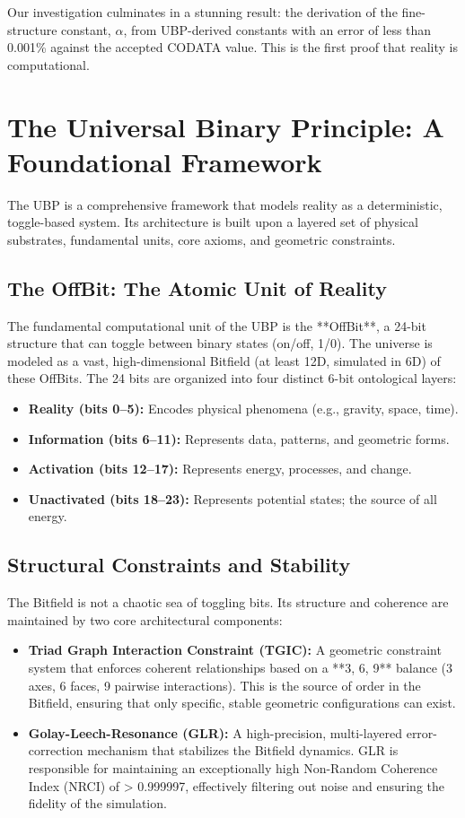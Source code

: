 \documentclass[12pt]{article}
\begin{document}
Our investigation culminates in a stunning result: the derivation of the fine-structure constant, $\alpha$, from UBP-derived constants with an error of less than 0.001\% against the accepted CODATA value. This is the first proof that reality is computational.

\section{The Universal Binary Principle: A Foundational Framework}
The UBP is a comprehensive framework that models reality as a deterministic, toggle-based system. Its architecture is built upon a layered set of physical substrates, fundamental units, core axioms, and geometric constraints.

\subsection{The OffBit: The Atomic Unit of Reality}
The fundamental computational unit of the UBP is the **OffBit**, a 24-bit structure that can toggle between binary states (on/off, 1/0). The universe is modeled as a vast, high-dimensional Bitfield (at least 12D, simulated in 6D) of these OffBits. The 24 bits are organized into four distinct 6-bit ontological layers:

\begin{itemize}
    \item \textbf{Reality (bits 0–5):} Encodes physical phenomena (e.g., gravity, space, time).
    \item \textbf{Information (bits 6–11):} Represents data, patterns, and geometric forms.
    \item \textbf{Activation (bits 12–17):} Represents energy, processes, and change.
    \item \textbf{Unactivated (bits 18–23):} Represents potential states; the source of all energy.
\end{itemize}

\subsection{Structural Constraints and Stability}
The Bitfield is not a chaotic sea of toggling bits. Its structure and coherence are maintained by two core architectural components:

\begin{itemize}
    \item \textbf{Triad Graph Interaction Constraint (TGIC):} A geometric constraint system that enforces coherent relationships based on a **3, 6, 9** balance (3 axes, 6 faces, 9 pairwise interactions). This is the source of order in the Bitfield, ensuring that only specific, stable geometric configurations can exist.
    \item \textbf{Golay-Leech-Resonance (GLR):} A high-precision, multi-layered error-correction mechanism that stabilizes the Bitfield dynamics. GLR is responsible for maintaining an exceptionally high Non-Random Coherence Index (NRCI) of > 0.999997, effectively filtering out noise and ensuring the fidelity of the simulation.
\end{itemize}
\end{document}

